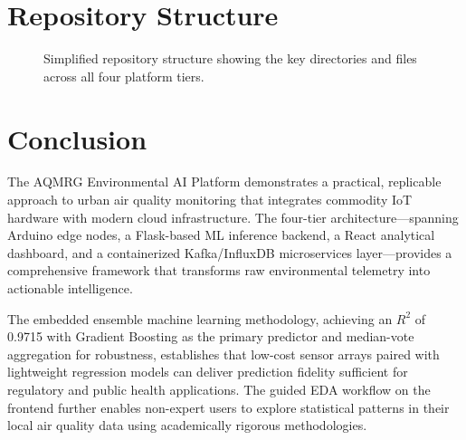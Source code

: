 \documentclass[12pt,a4paper]{article}
\begin{document}
\section{Repository Structure}

\begin{figure}[H]
\centering
{}
\caption{Simplified repository structure showing the key directories and files across all four platform tiers.}
\label{fig:repo}
\end{figure}

\section{Conclusion}

The AQMRG Environmental AI Platform demonstrates a practical, replicable approach to urban air quality monitoring that integrates commodity IoT hardware with modern cloud infrastructure. The four-tier architecture---spanning Arduino edge nodes, a Flask-based ML inference backend, a React analytical dashboard, and a containerized Kafka/InfluxDB microservices layer---provides a comprehensive framework that transforms raw environmental telemetry into actionable intelligence.

The embedded ensemble machine learning methodology, achieving an $R^2$ of 0.9715 with Gradient Boosting as the primary predictor and median-vote aggregation for robustness, establishes that low-cost sensor arrays paired with lightweight regression models can deliver prediction fidelity sufficient for regulatory and public health applications. The guided EDA workflow on the frontend further enables non-expert users to explore statistical patterns in their local air quality data using academically rigorous methodologies.
\end{document}
